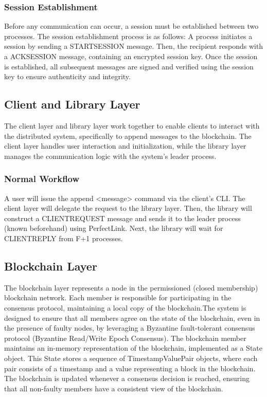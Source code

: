 \documentclass[runningheads]{llncs}
\begin{document}
\subsubsection{Session Establishment}

Before any communication can occur, a session must be established between two
processes. The session establishment process is as follows: A process initiates
a session by sending a STARTSESSION message. Then, the recipient responds with a
ACKSESSION message, containing an encrypted session key. Once the session is
established, all subsequent messages are signed and verified using the session
key to ensure authenticity and integrity.
%
\subsection{Client and Library Layer}
The client layer and library layer work together to enable clients to interact
with the distributed system, specifically to append messages to the blockchain.
The client layer handles user interaction and initialization, while the library
layer manages the communication logic with the system's leader process.
\subsubsection{Normal Workflow}
A user will issue the append <message> command via the client's CLI. The client
layer will delegate the request to the library layer. Then, the library will
construct a CLIENTREQUEST message and sends it to the leader process (known
beforehand) using PerfectLink. Next, the library will wait for CLIENTREPLY from
F+1 processes.

%
\subsection{Blockchain Layer}
The blockchain layer represents a node in the permissioned (closed membership)
blockchain network. Each member is responsible for participating in the
consensus protocol, maintaining a local copy of the blockchain.The system is
designed to ensure that all members agree on the state of the blockchain, even
in the presence of faulty nodes, by leveraging a Byzantine fault-tolerant
consensus protocol (Byzantine Read/Write Epoch Consensus). The blockchain member
maintains an in-memory representation of the blockchain, implemented as a State
object. This State stores a sequence of TimestampValuePair objects, where each
pair consists of a timestamp and a value representing a block in the blockchain.
The blockchain is updated whenever a consensus decision is reached, ensuring
that all non-faulty members have a consistent view of the blockchain.
\end{document}
